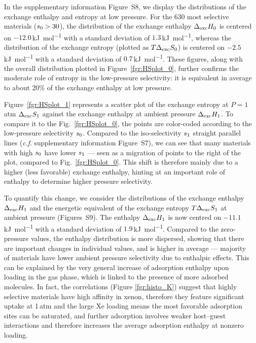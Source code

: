 \documentclass[main.tex]{subfiles}
\begin{document}
  
  In the supplementary information Figure~S8, we display the distributions of the exchange enthalpy and entropy at low pressure. For the 630 most selective materials ($s_{\text{0}} > 30$), the distribution of the exchange enthalpy $\Delta_{\text{exc}}H_{\text{0}}$ is centered on $-12.0$\,\si{\kilo\joule\per\mol} with a standard deviation of $1.3$\,\si{\kilo\joule\per\mol}, whereas the distribution of the exchange entropy (plotted as $T\Delta_{\text{exc}}S_{\text{0}}$) is centered on $-2.5$\,\si{\kilo\joule\per\mol} with a standard deviation of $0.7$\,\si{\kilo\joule\per\mol}. These figures, along with the overall distribution plotted in Figure~\ref{fgr:HSplot_0}, further confirms the moderate role of entropy in the low-pressure selectivity: it is equivalent in average to about {20\%} of the exchange enthalpy at low pressure.
  
  Figure~\ref{fgr:HSplot_1} represents a scatter plot of the exchange entropy at $P = 1$\,atm $\Delta_{\text{exc}}S_{\text{1}}$ against the exchange enthalpy at ambient pressure $\Delta_{\text{exc}}H_{\text{1}}$. To compare it to the Fig.~\ref{fgr:HSplot_0}, the points are color-coded according to the low-pressure selectivity $s_{\text{0}}$. Compared to the iso-selectivity $s_{\text{1}}$ straight parallel lines (\emph{c.f.} supplementary information Figure~S7), we can see that many materials with high $s_{\text{0}}$ have lower $s_{\text{1}}$ --- seen as a migration of points to the right of the plot, compared to Fig.~\ref{fgr:HSplot_0}. This shift is therefore mainly due to a higher (less favorable) exchange enthalpy, hinting at an important role of enthalpy to determine higher pressure selectivity.
  
  To quantify this change, we consider the distributions of the exchange enthalpy $\Delta_{\text{exc}}H_{\text{1}}$ and the energetic equivalent of the exchange entropy $T\Delta_{\text{exc}}S_{\text{1}}$ at ambient pressure (Figures~S9). The enthalpy $\Delta_{\text{exc}}H_{\text{1}}$ is now centred on $-11.1$\,\si{\kilo\joule\per\mol} with a standard deviation of $1.9$\,\si{\kilo\joule\per\mol}. Compared to the zero-pressure values, the enthalpy distribution is more dispersed, showing that there are important changes in individual values, and is higher in average --- majority of materials have lower ambient pressure selectivity due to enthalpic effects. This can be explained by the very general increase of adsorption enthalpy upon loading in the gas phase, which is linked to the presence of more adsorbed molecules. In fact, the correlations (Figure \ref{fgr:histo_K}) suggest that highly selective materials have high affinity in xenon, therefore they feature significant uptake at 1\,atm and the large Xe loading means the most favorable adsorption sites can be saturated, and further adsorption involves weaker host--guest interactions and therefore increases the average adsorption enthalpy at nonzero loading.
  
\end{document}
